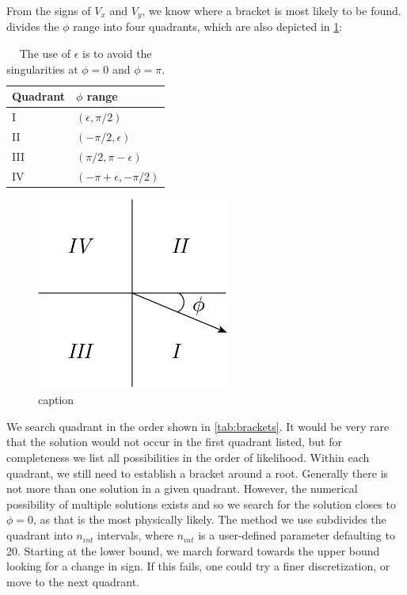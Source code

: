 \documentclass{article}
\begin{document}
From the signs of $V_x$ and $V_y$, we know where a bracket is most likely to be found.   divides the $\phi$ range into four quadrants, which are also depicted in \cref{fig:quadrants}:
\begin{table}[htb]
\centering
\caption{The use of $\epsilon$ is to avoid the singularities at $\phi = 0$ and $\phi = \pi$.}
\label{tab:quadrants}
\begin{tabular}{@{}ll@{}}
\toprule
Quadrant & $\phi$ range\\
\midrule
I & $(\epsilon, \pi/2)$ \\
II & $(-\pi/2, \epsilon)$ \\
III & $(\pi/2, \pi-\epsilon)$ \\
IV & $(-\pi+\epsilon, -\pi/2)$ \\
\bottomrule
\end{tabular}
\end{table}
\begin{figure}[htbp]
\centering
\includegraphics[width=2.5in]{figures/quadrants}
\caption{caption}
\label{fig:quadrants}
\end{figure}

We search quadrant in the order shown in \cref{tab:brackets}.  It would be very rare that the solution would not occur in the first quadrant listed, but for completeness we list all possibilities in the order of likelihood.  Within each quadrant, we still need to establish a bracket around a root.  Generally there is not more than one solution in a given quadrant.  However, the numerical possibility of multiple solutions exists and so we search for the solution closes to $\phi = 0$, as that is the most physically likely.  The method we use subdivides the quadrant into $n_{int}$ intervals, where $n_{int}$ is a user-defined parameter defaulting to 20.  Starting at the lower bound, we march forward towards the upper bound looking for a change in sign.  If this fails, one could try a finer discretization, or move to the next quadrant.
\end{document}
